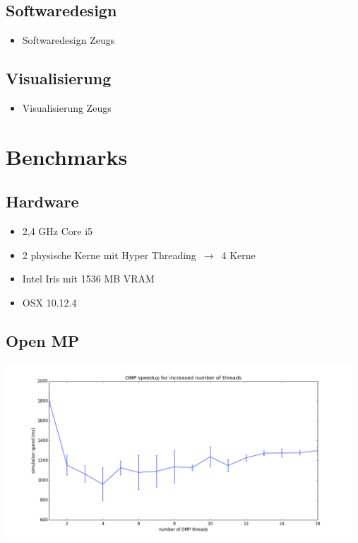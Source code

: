 \documentclass{beamer}
\begin{document}
\subsection{Softwaredesign}
\begin{frame}
\begin{itemize}
  \item Softwaredesign Zeugs
\end{itemize}
\end{frame}

\subsection{Visualisierung}
\begin{frame}
\begin{itemize}
  \item Visualisierung Zeugs
\end{itemize}
\end{frame}

\section{Benchmarks}
\subsection{Hardware}
\begin{frame}
\begin{itemize}
  \item 2,4 GHz Core i5
  \item 2 physische Kerne mit Hyper Threading $\,\to\,$ 4 Kerne
  \item Intel Iris mit 1536 MB VRAM
  \item OSX 10.12.4
\end{itemize}
\end{frame}

\subsection{Open MP}
\begin{frame}
\includegraphics[width=13cm]{img/omp_1000b_1000s_10r.png}
\end{frame}
\end{document}
